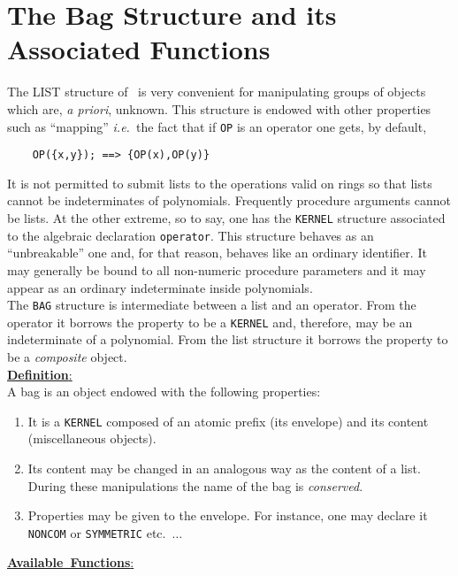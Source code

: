 \section{The Bag Structure and its Associated Functions}
The LIST structure of \REDUCE\ is very convenient for manipulating
groups of objects which are, {\em a priori}, unknown. This structure is
endowed with other properties such as ``mapping'' {\em i.e.\ }the fact
that if \verb+OP+ is an operator one gets, by default,
\begin{verbatim}
	OP({x,y}); ==> {OP(x),OP(y)}
\end{verbatim}
It is not permitted to submit lists to the operations valid on rings
so that lists cannot be indeterminates of polynomials.  Frequently
procedure arguments cannot be lists.
At the other extreme, so to say, one has the \verb+KERNEL+
structure associated
to the algebraic declaration \verb+operator+.  This structure behaves as
an ``unbreakable'' one and, for that reason, behaves
like an ordinary identifier.
It may generally be bound to all non-numeric procedure parameters
and it may appear
as an ordinary indeterminate inside polynomials. \\
The \verb+BAG+ structure is intermediate between a list and an operator.
From the operator it borrows the property to be a \verb+KERNEL+ and,
therefore, may be an indeterminate of a polynomial. From the list structure
it borrows the property to be a {\em composite} object.\\[5pt]
\mbox{\underline{{\bf Definition}:\hfill}}\\[4pt]
A bag is an object endowed with the following properties:
\begin{enumerate}
\item It is a \verb+KERNEL+ composed of an atomic prefix (its
envelope) and
its content (miscellaneous objects).
\item Its content may be changed in an analogous way as the content of a
list. During these manipulations the name of the bag is {\em conserved}.
\item Properties may be given to the envelope. For instance, one may
declare it \verb+NONCOM+ or \verb+SYMMETRIC+ etc.\ $\ldots$
\end{enumerate}
\vspace{5pt}
\mbox{\underline{{\bf Available Functions}:\hfill}}
